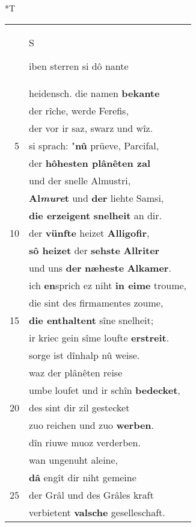 \documentclass[8pt,a4paper,notitlepage]{article}
\begin{document}
\begin{table}[ht]
\begin{minipage}[t]{0.5\linewidth}
\end{minipage}
\hspace{0.5cm}
\begin{minipage}[t]{0.5\linewidth}
\small
\begin{center}*T
\end{center}
\begin{tabular}{rl}
 & \begin{large}S\end{large}iben sterren si dô nante\\ 
 & heidensch. die namen \textbf{bekante}\\ 
 & der rîche, werde Ferefis,\\ 
 & der vor ir saz, swarz und wîz.\\ 
5 & si sprach: "\textbf{nû} prüeve, Parcifal,\\ 
 & der \textbf{hôhesten plânêten zal}\\ 
 & und der snelle Almustri,\\ 
 & \textbf{Al\textit{mure}t} und \textbf{der} liehte Samsi,\\ 
 & \textbf{die erzeigent} \textbf{snelheit} an dir.\\ 
10 & der \textbf{vünfte} heizet \textbf{Alligofir},\\ 
 & \textbf{sô heizet} der \textbf{sehste} \textbf{Allriter}\\ 
 & und uns \textbf{der} \textbf{næheste} \textbf{Alkamer}.\\ 
 & ich \textbf{en}sprich ez niht \textbf{in eime} troume,\\ 
 & die sint des firmamentes zoume,\\ 
15 & \textbf{die enthaltent} sîne snelheit;\\ 
 & ir kriec gein sîme loufte \textbf{erstreit}.\\ 
 & sorge ist dînhalp nû weise.\\ 
 & waz der plânêten reise\\ 
 & umbe loufet und ir schîn \textbf{bedecket},\\ 
20 & des sint dir zil gestecket\\ 
 & zuo reichen und zuo \textbf{werben}.\\ 
 & dîn riuwe muoz verderben.\\ 
 & wan ungenuht aleine,\\ 
 & \textbf{dâ} engît dir niht gemeine\\ 
25 & der Grâl und des Grâles kraft\\ 
 & verbietent \textbf{valsche} geselleschaft.\\ 

\end{tabular}
\end{minipage}
\end{table}
\end{document}
